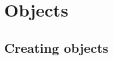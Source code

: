 \documentclass[10pt,compress]{beamer} %
\begin{document}
\section{Objects}
\subsection{Creating objects}
%			

%			
\end{document}
